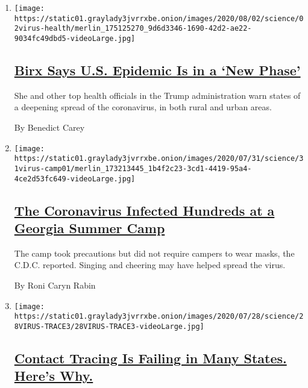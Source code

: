 \begin{enumerate}
\def\labelenumi{\arabic{enumi}.}
\item
  \texttt{[image: https://static01.graylady3jvrrxbe.onion/images/2020/08/02/science/02virus-health/merlin\_175125270\_9d6d3346-1690-42d2-ae22-9034fc49dbd5-videoLarge.jpg]}

  \hypertarget{birx-says-us-epidemic-is-in-a-new-phase}{%
  \subsection{\texorpdfstring{\href{/2020/08/02/health/dr-birx-coronavirus-phase.html}{Birx
  Says U.S. Epidemic Is in a `New
  Phase'}}{Birx Says U.S. Epidemic Is in a `New Phase'}}\label{birx-says-us-epidemic-is-in-a-new-phase}}

  She and other top health officials in the Trump administration warn
  states of a deepening spread of the coronavirus, in both rural and
  urban areas.

  By Benedict Carey
\item
  \texttt{[image: https://static01.graylady3jvrrxbe.onion/images/2020/07/31/science/31virus-camp01/merlin\_173213445\_1b4f2c23-3cd1-4419-95a4-4ce2d53fc649-videoLarge.jpg]}

  \hypertarget{the-coronavirus-infected-hundreds-at-a-georgia-summer-camp}{%
  \subsection{\texorpdfstring{\href{/2020/07/31/health/coronavirus-children-camp.html}{The
  Coronavirus Infected Hundreds at a Georgia Summer
  Camp}}{The Coronavirus Infected Hundreds at a Georgia Summer Camp}}\label{the-coronavirus-infected-hundreds-at-a-georgia-summer-camp}}

  The camp took precautions but did not require campers to wear masks,
  the C.D.C. reported. Singing and cheering may have helped spread the
  virus.

  By Roni Caryn Rabin
\item
  \texttt{[image: https://static01.graylady3jvrrxbe.onion/images/2020/07/28/science/28VIRUS-TRACE3/28VIRUS-TRACE3-videoLarge.jpg]}

  \hypertarget{contact-tracing-is-failing-in-many-states-heres-why}{%
  \subsection{\texorpdfstring{\href{/2020/07/31/health/covid-contact-tracing-tests.html}{Contact
  Tracing Is Failing in Many States. Here's
  Why.}}{Contact Tracing Is Failing in Many States. Here's Why.}}\label{contact-tracing-is-failing-in-many-states-heres-why}}


\end{enumerate}
